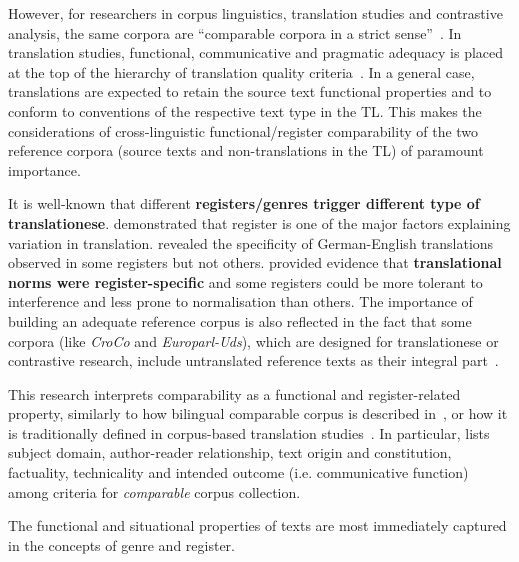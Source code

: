 However, for researchers in corpus linguistics, translation studies and contrastive analysis, the same corpora are ``comparable corpora in a strict sense''~\cite[p.19]{McEnery2007}. 
In translation studies, functional, communicative and pragmatic adequacy is placed at the top of the hierarchy of translation quality criteria~\cite{Nord2006}. In a general case, translations are expected to retain the source text functional properties and to conform to conventions of the respective text type in the TL. This makes the considerations of cross-linguistic functional/register comparability of the two reference corpora (source texts and non-translations in the TL) of paramount importance. 

It is well-known that different \textbf{registers/genres trigger different type of translationese}. \citet{Lapshinova2017} demonstrated that register is one of the major factors explaining variation in translation. \citet{Neumann2013} revealed the specificity of German-English translations observed in some registers but not others. \citet{Delaere2015} provided evidence that \textbf{translational norms were register-specific} and some registers could be more tolerant to interference and less prone to normalisation than others.
The importance of building an adequate reference corpus is also reflected in the fact that some corpora (like \textit{CroCo} and \textit{Europarl-Uds}), which are designed for translationese or contrastive research, include untranslated reference texts as their integral part~\cite[see][respectively]{HansenSchirra2012,Karakanta2018}.

This research interprets comparability as a functional and register-related property, similarly to how bilingual comparable corpus is described in~\citet{Kutuzov2016}, or how it is traditionally defined in corpus-based translation studies~\cite{Zanettin1998}. In particular, \citet{Zanettin1998} lists subject domain, author-reader relationship, text origin and constitution, factuality, technicality and intended outcome (i.e. communicative function) among criteria for \textit{comparable} corpus collection. 

The functional and situational properties of texts are most immediately captured in the concepts of genre and register. 

